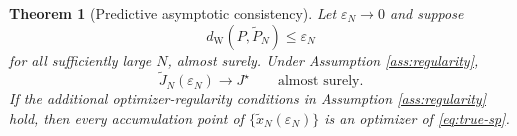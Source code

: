 \documentclass[11pt]{article}
\newtheorem{theorem}{Theorem}[section]
\newcommand{\1}{\mathbf{1}}
\newcommand{\dW}{d_{\mathrm W}}
\newcommand{\Ptil}{\widetilde P_N}
\begin{document}
\begin{theorem}[Predictive asymptotic consistency]\label{thm:pred-consistency}
Let $\varepsilon_N\to0$ and suppose
\begin{equation}\label{eq:eventual-pred-coverage}
    \dW(P,\Ptil)\le\varepsilon_N
\end{equation}
for all sufficiently large $N$, almost surely. Under Assumption \ref{ass:regularity},
\begin{equation}
    \widetilde J_N(\varepsilon_N)\to J^\star
    \qquad\text{almost surely.}
\end{equation}
If the additional optimizer-regularity conditions in Assumption \ref{ass:regularity} hold, then every accumulation point of $\{\widetilde x_N(\varepsilon_N)\}$ is an optimizer of \eqref{eq:true-sp}.
\end{theorem}
\end{document}
